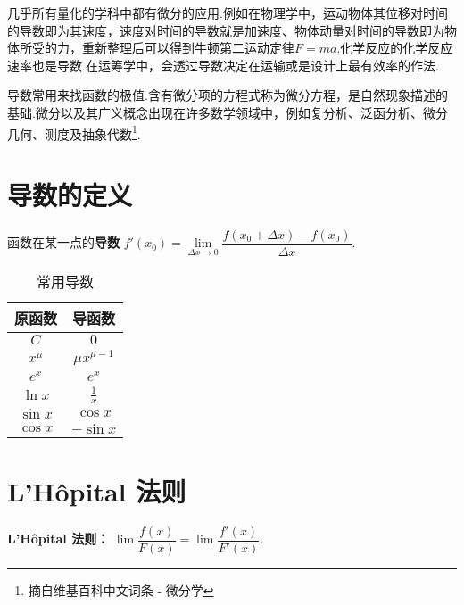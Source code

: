 \documentclass[
    b5paper,  %
    decoration,  %
]{qyxf-book}
\begin{document}
几乎所有量化的学科中都有微分的应用.例如在物理学中，运动物体其位移对时间的导数即为其速度，速度对时间的导数就是加速度、物体动量对时间的导数即为物体所受的力，重新整理后可以得到牛顿第二运动定律$F=ma$.化学反应的化学反应速率也是导数.在运筹学中，会透过导数决定在运输或是设计上最有效率的作法.

导数常用来找函数的极值.含有微分项的方程式称为微分方程，是自然现象描述的基础.微分以及其广义概念出现在许多数学领域中，例如复分析、泛函分析、微分几何、测度及抽象代数\footnote{摘自维基百科中文词条 - 微分学\cite{ref:wiki-diff-calculus}}.

\newpage

\section{导数的定义}

\begin{define}
	函数在某一点的\textbf{导数} $f'(x_0)=\lim\limits_{\Delta x \to 0}\dfrac{f(x_0 + \Delta x) - f(x_0)}{\Delta x}$.
\end{define}

\begin{table}[ht]
\centering
\caption{常用导数}
\begin{tabular}{c|c}
\toprule
\textbf{原函数} & \textbf{导函数} \\
\midrule
$C$      & $0$               \\
$x^\mu$  & $\mu x^{\mu - 1}$ \\
$e^x$    & $e^x$             \\
$\ln x$  & $\frac{1}{x}$     \\
$\sin x$ & $\cos x$          \\
$\cos x$ & $-\sin x$         \\
\bottomrule
\end{tabular}
\end{table}

\newpage

\section{L'Hôpital 法则}

\begin{theorem}
    \textbf{L'Hôpital 法则：} $\lim \dfrac{f(x)}{F(x)} = \lim \dfrac{f'(x)}{F'(x)}$.
\end{theorem}

  
\nocite{*}

\end{document}
